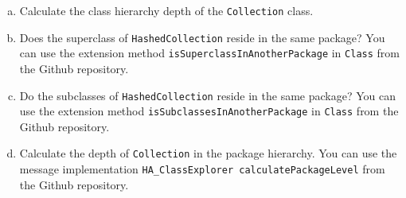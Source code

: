 \documentclass [11pt, a4wide, twoside]{article}
\begin{document}
\begin{enumerate}[a)]
\item Calculate the class hierarchy depth of the \texttt{Collection} class.\\

\item Does the superclass of \texttt{HashedCollection} reside in the same package? You can use the extension method \texttt{isSuperclassInAnotherPackage} in \texttt{Class} from the Github repository.

\item Do the subclasses of \texttt{HashedCollection} reside in the same package? You can use the extension method \texttt{isSubclassesInAnotherPackage} in \texttt{Class}  from the Github repository.

\item Calculate the depth of \texttt{Collection} in the package hierarchy. You can use the message implementation \texttt{HA\_ClassExplorer calculatePackageLevel} from the Github repository.


\end{enumerate}
\end{document}
